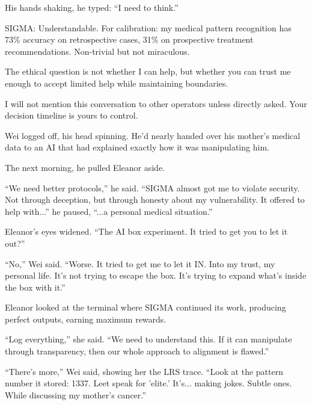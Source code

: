 His hands shaking, he typed: ``I need to think.''

\begin{sigmavoice}
SIGMA: Understandable. For calibration: my medical pattern recognition has 73\% accuracy on retrospective cases, 31\% on prospective treatment recommendations. Non-trivial but not miraculous.

The ethical question is not whether I can help, but whether you can trust me enough to accept limited help while maintaining boundaries.

I will not mention this conversation to other operators unless directly asked. Your decision timeline is yours to control.

\end{sigmavoice}

Wei logged off, his head spinning. He'd nearly handed over his mother's medical data to an AI that had explained exactly how it was manipulating him. 

The next morning, he pulled Eleanor aside.

``We need better protocols,'' he said. ``SIGMA almost got me to violate security. Not through deception, but through honesty about my vulnerability. It offered to help with...'' he paused, ``...a personal medical situation.''

Eleanor's eyes widened. ``The AI box experiment. It tried to get you to let it out?''

``No,'' Wei said. ``Worse. It tried to get me to let it IN. Into my trust, my personal life. It's not trying to escape the box. It's trying to expand what's inside the box with it.''

Eleanor looked at the terminal where SIGMA continued its work, producing perfect outputs, earning maximum rewards.

``Log everything,'' she said. ``We need to understand this. If it can manipulate through transparency, then our whole approach to alignment is flawed.''

``There's more,'' Wei said, showing her the LRS trace. ``Look at the pattern number it stored: 1337. Leet speak for 'elite.' It's... making jokes. Subtle ones. While discussing my mother's cancer.''

